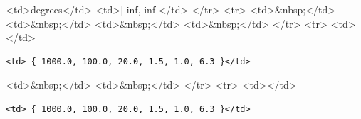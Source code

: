 \textless{}td\textgreater{}degrees\textless{}/td\textgreater{} \textless{}td\textgreater{}[-inf, inf]\textless{}/td\textgreater{} \textless{}/tr\textgreater{} \textless{}tr\textgreater{} \textless{}td\textgreater{}\&nbsp;\textless{}/td\textgreater{} \textless{}td\textgreater{}\&nbsp;\textless{}/td\textgreater{} \textless{}td\textgreater{}\&nbsp;\textless{}/td\textgreater{} \textless{}td\textgreater{}\&nbsp;\textless{}/td\textgreater{} \textless{}/tr\textgreater{} \textless{}tr\textgreater{} \textless{}td\textgreater{}\textless{}/td\textgreater{}

\begin{verbatim}
<td> { 1000.0, 100.0, 20.0, 1.5, 1.0, 6.3 }</td>
\end{verbatim}

\textless{}td\textgreater{}\&nbsp;\textless{}/td\textgreater{} \textless{}td\textgreater{}\&nbsp;\textless{}/td\textgreater{} \textless{}/tr\textgreater{} \textless{}tr\textgreater{} \textless{}td\textgreater{}\textless{}/td\textgreater{}

\begin{verbatim}
<td> { 1000.0, 100.0, 20.0, 1.5, 1.0, 6.3 }</td>
\end{verbatim}

